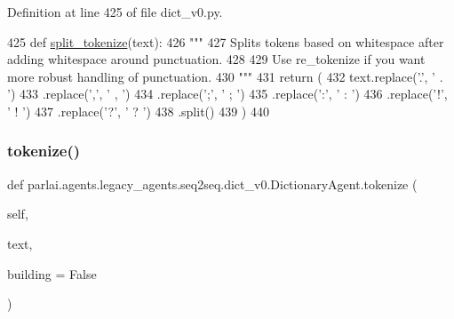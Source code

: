 Definition at line 425 of file dict\+\_\+v0.\+py.


\begin{DoxyCode}
425     \textcolor{keyword}{def }\hyperlink{namespaceparlai_1_1mturk_1_1tasks_1_1wizard__of__wikipedia_1_1worlds_a040aaf5ecfbddec14f321279454f85a8}{split\_tokenize}(text):
426         \textcolor{stringliteral}{"""}
427 \textcolor{stringliteral}{        Splits tokens based on whitespace after adding whitespace around punctuation.}
428 \textcolor{stringliteral}{}
429 \textcolor{stringliteral}{        Use re\_tokenize if you want more robust handling of punctuation.}
430 \textcolor{stringliteral}{        """}
431         \textcolor{keywordflow}{return} (
432             text.replace(\textcolor{stringliteral}{'.'}, \textcolor{stringliteral}{' . '})
433             .replace(\textcolor{stringliteral}{','}, \textcolor{stringliteral}{' , '})
434             .replace(\textcolor{stringliteral}{';'}, \textcolor{stringliteral}{' ; '})
435             .replace(\textcolor{stringliteral}{':'}, \textcolor{stringliteral}{' : '})
436             .replace(\textcolor{stringliteral}{'!'}, \textcolor{stringliteral}{' ! '})
437             .replace(\textcolor{stringliteral}{'?'}, \textcolor{stringliteral}{' ? '})
438             .split()
439         )
440 
\end{DoxyCode}
\mbox{\label{classparlai_1_1agents_1_1legacy__agents_1_1seq2seq_1_1dict__v0_1_1DictionaryAgent_aa551af633278b71b0a8da65180b79202}} 
\subsubsection{\texorpdfstring{tokenize()}{tokenize()}}
{\footnotesize\ttfamily def parlai.\+agents.\+legacy\+\_\+agents.\+seq2seq.\+dict\+\_\+v0.\+Dictionary\+Agent.\+tokenize (\begin{DoxyParamCaption}\item[{}]{self,  }\item[{}]{text,  }\item[{}]{building = {\ttfamily False} }\end{DoxyParamCaption})}

